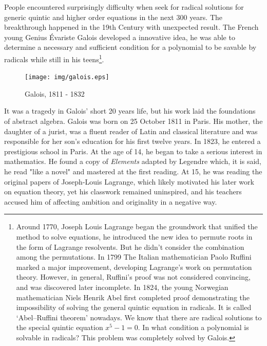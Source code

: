 \documentclass{article}
\begin{document}
People encountered surprisingly difficulty when seek for radical solutions for generic quintic and higher order equations in the next 300 years. The breakthrough happened in the 19th Century with unexpected result. The French young Genius Évariste Galois developed a innovative idea, he was able to determine a necessary and sufficient condition for a polynomial to be savable by radicals while still in his teens\footnote{Around 1770, Joseph Louis Lagrange began the groundwork that unified the method to solve equations, he introduced the new idea to permute roots in the form of Lagrange resolvents. But he didn't consider the combination among the permutations. In 1799 The Italian mathematician Paolo Ruffini marked a major improvement, developing Lagrange's work on permutation theory. However, in general, Ruffini's proof was not considered convincing, and was discovered later incomplete. In 1824, the young Norwegian mathematician Niels Henrik Abel first completed proof demonstrating the impossibility of solving the general quintic equation in radicals. It is called `Abel–Ruffini theorem' nowadays. We know that there are radical solutions to the special quintic equation $x^5-1=0$. In what condition a polynomial is solvable in radicals? This problem was completely solved by Galois\cite{Wiki-Galois-theory}.}.

\begin{figure}
 \centering
 \texttt{[image: img/galois.eps]}
 \captionsetup{labelformat=empty}
 \caption{Galois, 1811 - 1832}
 \label{fig:Galois}
\end{figure}

It was a tragedy in Galois' short 20 years life, but his work laid the foundations of abstract algebra. Galois was born on 25 October 1811 in Paris. His mother, the daughter of a jurist, was a fluent reader of Latin and classical literature and was responsible for her son's education for his first twelve years. In 1823, he entered a prestigious school in Paris. At the age of 14, he began to take a serious interest in mathematics. He found a copy of {\em Elements} adapted by Legendre which, it is said, he read "like a novel" and mastered at the first reading. At 15, he was reading the original papers of Joseph-Louis Lagrange, which likely motivated his later work on equation theory, yet his classwork remained uninspired, and his teachers accused him of affecting ambition and originality in a negative way.
\end{document}
